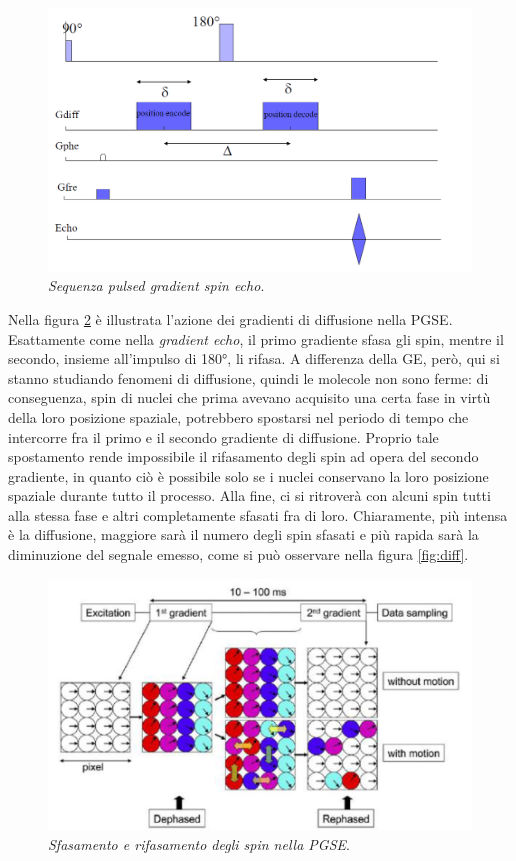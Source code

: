 \documentclass{report}
\newcommand{\figref}[1]{figura \ref{#1}}
\numberwithin{equation}{section}
\numberwithin{figure}{section}
\begin{document}
\begin{figure}[htp]
\centering
\includegraphics[scale=0.55]{immagini/pgse.png}
\caption{\label{fig:pgse} \textit{Sequenza pulsed gradient spin echo}.}
\end{figure}

\noindent Nella \figref{fig:pgse2} è illustrata l'azione dei gradienti di diffusione nella PGSE. Esattamente come nella \textit{gradient echo}, il primo gradiente sfasa gli spin, mentre il secondo, insieme all'impulso di 180°, li rifasa. A differenza della GE, però, qui si stanno studiando fenomeni di diffusione, quindi le molecole non sono ferme: di conseguenza, spin di nuclei che prima avevano acquisito una certa fase in virtù della loro posizione spaziale, potrebbero spostarsi nel periodo di tempo che intercorre fra il primo e il secondo gradiente di diffusione. Proprio tale spostamento rende impossibile il rifasamento degli spin ad opera del secondo gradiente, in quanto ciò è possibile solo se i nuclei conservano la loro posizione spaziale durante tutto il processo. Alla fine, ci si ritroverà con alcuni spin tutti alla stessa fase e altri completamente sfasati fra di loro. Chiaramente, più intensa è la diffusione, maggiore sarà il numero degli spin sfasati e più rapida sarà la diminuzione del segnale emesso, come si può osservare nella \figref{fig:diff}.

\begin{figure}[htp]
\centering
\includegraphics[scale=0.73]{immagini/pgse2.png}
\caption{\label{fig:pgse2} \textit{Sfasamento e rifasamento degli spin nella PGSE}.}
\end{figure}
\end{document}
